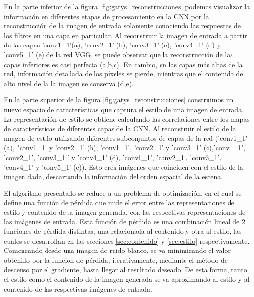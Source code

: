 \documentclass[a4paper,11pt,spanish]{book}
\begin{document}
      En la parte inferior de la figura \ref{fig:gatys_reconstrucciones} podemos visualizar la información en diferentes etapas de procesamiento en la CNN por la reconstrucción
      de la imagen de entrada solamente conociendo las respuestas de los filtros en una capa en particular. 
      Al reconstruir la imagen de entrada a partir de las capas 'conv1\_1'(a), 'conv2\_1' (b), 'conv3\_1' (c), 'conv4\_1' (d) y 'conv5\_1' (e) de la red VGG,
      se puede observar que la reconstrucción de las capas inferiores es casi perfecta (a,b,c). 
      En cambio, en las capas más altas de la red, información detallada de los píxeles se pierde, mientras que el contenido de alto nivel  de la la imagen se conserva (d,e). 
	
      En la parte superior de la figura \ref{fig:gatys_reconstrucciones} construimos un nuevo espacio de características que captura el estilo de una imagen de entrada.
      La representación de estilo se obtiene calculando las correlaciones entre los mapas de características de diferentes capas de la CNN. Al reconstruir el estilo de la imagen de estilo
      utilizando diferentes subconjuntos de capas de la red ('conv1\_1' (a), "conv1\_1' y 'conv2\_1' (b), 'conv1\_1', 'conv2\_1' y 'conv3\_1' (c),'conv1\_1', 'conv2\_1', 'conv3\_1 ' y 'conv4\_1' (d),
      'conv1\_1', 'conv2\_1', 'conv3\_1', 'conv4\_1' y 'conv5\_1' (e)).
      Esto crea imágenes que coinciden con el estilo de la imagen dada, descartando la información del orden espacial de la escena.
      
      El algoritmo presentado se reduce a un problema de optimización, en el cual se define una función de pérdida que mide el error entre las representaciones de estilo y contenido 
      de la imagen generada, con las respectivas representaciones de las imágenes de entrada.
      Esta función de pérdida es una combinación lineal de 2 funciones de pérdida distintas, una relacionada al contenido y otra al estilo, las cuales se desarrollan en las secciones \ref{sec:contenido} y \ref{sec:estilo} respectivamente.
      Comenzando desde una imagen de ruido blanco, se va minimizando el valor obtenido por la función de pérdida, iterativamente, mediante el método de descenso por el gradiente, hasta 
      llegar al resultado deseado.
      De esta forma, tanto el estilo como el contenido de la imagen generada se va aproximando al estilo y al contenido de las respectivas imágenes de entrada.
      
\end{document}
